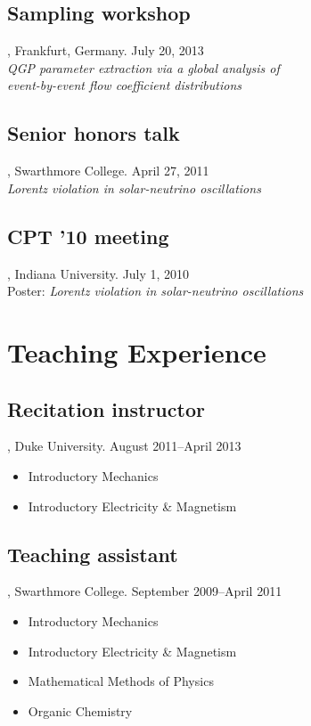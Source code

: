 \documentclass[letterpaper,10pt]{article}
\begin{document}
\subsection{Sampling workshop}, Frankfurt, Germany. \hfill July 20, 2013 \\
\emph{QGP parameter extraction via a global analysis of \\ event-by-event flow coefficient distributions}


\subsection{Senior honors talk}, Swarthmore College. \hfill April 27, 2011 \\
\emph{Lorentz violation in solar-neutrino oscillations}


\subsection{CPT '10 meeting}, Indiana University. \hfill July 1, 2010 \\
Poster: \emph{Lorentz violation in solar-neutrino oscillations}





\section{Teaching Experience}

\subsection{Recitation instructor}, Duke University. \hfill August 2011--April 2013

\begin{itemize}
  \item Introductory Mechanics
  \item Introductory Electricity \& Magnetism
\end{itemize}


\subsection{Teaching assistant}, Swarthmore College. \hfill September 2009--April 2011

\begin{itemize}
  \item Introductory Mechanics
  \item Introductory Electricity \& Magnetism
  \item Mathematical Methods of Physics
  \item Organic Chemistry
\end{itemize}
\end{document}
